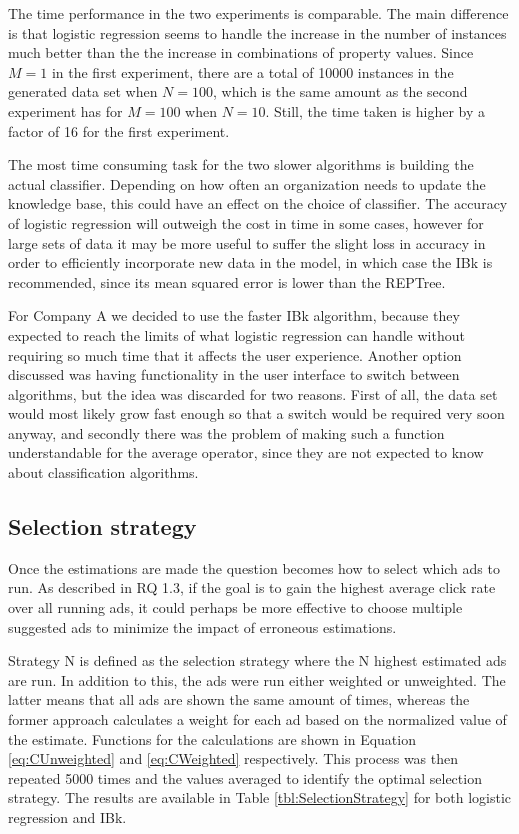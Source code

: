 \documentclass{sig-alternate}
\begin{document}
The time performance in the two experiments is comparable. The main difference is that logistic regression seems to handle the increase in the number of instances much better than the the increase in combinations of property values. Since \(M=1\) in the first experiment, there are a total of 10000 instances in the generated data set when \(N=100\), which is the same amount as the second experiment has for \(M=100\) when \(N=10\). Still, the time taken is higher by a factor of 16 for the first experiment.

The most time consuming task for the two slower algorithms is building the actual classifier. Depending on how often an organization needs to update the knowledge base, this could have an effect on the choice of classifier. The accuracy of logistic regression will outweigh the cost in time in some cases, however for large sets of data it may be more useful to suffer the slight loss in accuracy in order to efficiently incorporate new data in the model, in which case the IBk is recommended, since its mean squared error is lower than the REPTree.

For Company A we decided to use the faster IBk algorithm, because they expected to reach the limits of what logistic regression can handle without requiring so much time that it affects the user experience. Another option discussed was having functionality in the user interface to switch between algorithms, but the idea was discarded for two reasons. First of all, the data set would most likely grow fast enough so that a switch would be required very soon anyway, and secondly there was the problem of making such a function understandable for the average operator, since they are not expected to know about classification algorithms.

\subsection{Selection strategy}
Once the estimations are made the question becomes how to select which ads to run. As described in RQ 1.3, if the goal is to gain the highest average click rate over all running ads, it could perhaps be more effective to choose multiple suggested ads to minimize the impact of erroneous estimations.

Strategy N is defined as the selection strategy where the N highest estimated ads are run. In addition to this, the ads were run either weighted or unweighted. The latter means that all ads are shown the same amount of times, whereas the former approach calculates a weight for each ad based on the normalized value of the estimate. Functions for the calculations are shown in Equation \ref{eq:CUnweighted} and \ref{eq:CWeighted} respectively. This process was then repeated 5000 times and the values averaged to identify the optimal selection strategy. The results are available in Table \ref{tbl:SelectionStrategy} for both logistic regression and IBk.
\end{document}
